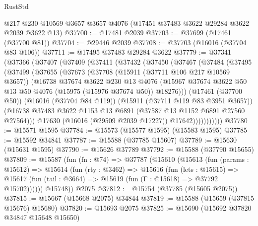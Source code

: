 \begin{lexlean}{RustStd}
\begin{coremodule}
    @217
    @230
    @10569
    @3657
    @3657
    @4076
    (@17451 @37483 @3622 @29284 @3622 @2039 @3622 @13)
@37700 := @17481 @2039
@37703 := @37699 (@17461 (@37700 @81))
@37704 := @29446 @2039
@37708 := @37703 (@16016 (@37704 @83 @106))
@37711 := @17495 @37483 @29284 @3622
@37779 := @37341
    (@37366
      (@37407
        (@37409
          (@37411
            (@37432
              (@37450
                (@37467
                  (@37484
                    (@37495
                      (@37499
                        (@37655
                          (@37673
                            (@37708
                              (@15911 (@37711 @106 @217 @10569 @3657))
                              (@16738
                                @37674
                                @3622
                                @230
                                @13
                                @4076
                                (@15967
                                  @37674
                                  @3622
                                  @50
                                  @13
                                  @50
                                  @4076
                                  (@15975 (@15976 @37674 @50))
                                  @18276)))
                            (@17461 (@37700 @50))
                            (@16016 (@37704 @84 @119))
                            (@15911 (@37711 @119 @83 @3951 @3657))
                            (@16738
                              @37483
                              @3622
                              @1153
                              @13
                              @6891
                              (@37587 @13 @1152 @6891 @27560 @27564)))
                          @17630
                          (@16016 (@29509 @2039 @17227))
                          @17642)))))))))))
@37780 := @15571 @1595
@37784 := @15573 (@15577 @1595) (@15583 @1595)
@37785 := @15592 @34841
@37787 := @15588 (@37785 @15607)
@37789 := @15630 (@15631 @1595)
@37790 := @15626 @37789
@37792 := @15588 (@37790 @15655)
@37809 := @15587
    (fun (fn : @74) =>
    @37787
      (@15610
        (@15613
          (fun (params : @15612) =>
          @15614
            (fun (rty : @3462) =>
            @15616
              (fun (lets : @15615) =>
              @15617 (fun (tail : @3664) => @15619 (fun (Γ : @15618) => @37792 @15702))))))
        @15748))
    @2075
@37812 := @15754 (@37785 (@15605 @2075))
@37815 := @15667 (@15668 @2075) @34844
@37819 := @15588 (@15659 (@37815 @15676) @15680)
@37820 := @15693 @2075
@37825 := @15690 (@15692 @37820 @34847 @15648 @15650)

\end{coremodule}
\end{lexlean}

